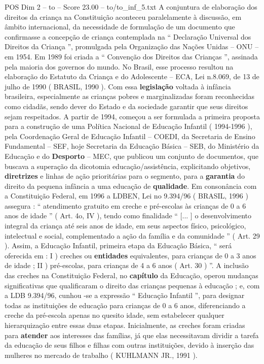 \begin{textsample}{POS Dim 2 – to – Score 23.00 – to/to\_inf\_5.txt}
A conjuntura de elaboração dos direitos da criança na Constituição aconteceu paralelamente à discussão, em âmbito internacional, da necessidade de formulação de um documento que confirmasse a concepção de criança contemplada na “ Declaração Universal dos Direitos da Criança ”, promulgada pela Organização das Nações Unidas – ONU – em 1954.
Em 1989 foi criada a “ Convenção dos Direitos das Crianças ”, assinada pela maioria dos governos do mundo.
No Brasil, esse processo resultou na elaboração do Estatuto da Criança e do Adolescente – ECA, Lei n.8.069, de 13 de julho de 1990 ( BRASIL, 1990 ).
Com essa \textbf{legislação} voltada à infância brasileira, especialmente as crianças pobres e marginalizadas foram reconhecidas como cidadãs, sendo dever do Estado e da sociedade garantir que seus direitos sejam respeitados.
A partir de 1994, começou a ser formulada a primeira proposta para a construção de uma Política Nacional de Educação Infantil ( 1994-1996 ), pela Coordenação Geral de Educação Infantil – COEDI, da Secretaria de Ensino Fundamental – SEF, hoje Secretaria da Educação Básica – SEB, do Ministério da Educação e do \textbf{Desporto} – MEC, que publicou um conjunto de documentos, que buscava a superação da dicotomia educação/assistência, explicitando objetivos, \textbf{diretrizes} e linhas de ação prioritárias para o segmento, para a \textbf{garantia} do direito da pequena infância a uma educação de \textbf{qualidade}.
Em consonância com a Constituição Federal, em 1996 a LDBEN, Lei no 9.394/96 ( BRASIL, 1996 ) assegura : “ atendimento gratuito em creche e pré-escolas às crianças de 0 a 6 anos de idade ” ( Art. 4o, IV ), tendo como finalidade “ [... ] o desenvolvimento integral da criança até seis anos de idade, em seus aspectos físico, psicológico, intelectual e social, complementado a ação da família e da comunidade ” ( Art. 29 ).
Assim, a Educação Infantil, primeira etapa da Educação Básica, “ será oferecida em : I ) creches ou \textbf{entidades} equivalentes, para crianças de 0 a 3 anos de idade ; II ) pré-escolas, para crianças de 4 a 6 anos ( Art. 30 ) ”.
A inclusão das creches na Constituição Federal, no \textbf{capítulo} da Educação, operou mudanças significativas que qualificaram o direito das crianças pequenas à educação ; e, com a LDB 9.394/96, cunhou -se a expressão “ Educação Infantil ”, para designar todas as instituições de educação para crianças de 0 a 6 anos, diferenciando a creche da pré-escola apenas no quesito idade, sem estabelecer qualquer hierarquização entre essas duas etapas.
Inicialmente, as creches foram criadas para \textbf{atender} aos interesses das famílias, já que elas necessitavam dividir a tarefa da educação de seus filhos e filhas com outras instituições, devido à inserção das mulheres no mercado de trabalho ( KUHLMANN JR., 1991 ).

\end{textsample}
